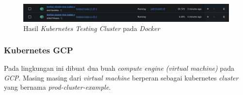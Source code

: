 \begin{figure}[htbp]
    \centering
    \includegraphics[width=1\textwidth]{resources/chapter-4/pengujian/kubernetes-lokal-config-result.jpg}
    \caption{Hasil \textit{Kubernetes Testing Cluster} pada \textit{Docker}}
    \label{fig:kubernetes-lokal-config-testing-result}
\end{figure}

\subsubsection{Kubernetes GCP}
\label{subsubsec:kubernetes-gcp}
Pada lingkungan ini dibuat dua buah \textit{compute engine (virtual machine)} pada \textit{GCP}. Masing masing dari \textit{virtual machine} berperan sebagai kubernetes \textit{cluster} yang bernama \textit{prod-cluster-example}.

